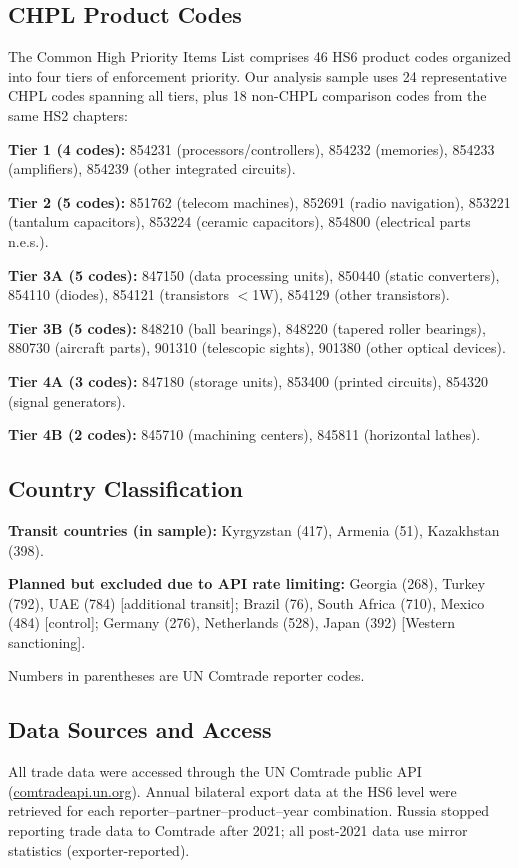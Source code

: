 \documentclass[12pt]{article}
\begin{document}
\subsection{CHPL Product Codes}

The Common High Priority Items List comprises 46 HS6 product codes organized into four tiers of enforcement priority. Our analysis sample uses 24 representative CHPL codes spanning all tiers, plus 18 non-CHPL comparison codes from the same HS2 chapters:

\textbf{Tier 1 (4 codes):} 854231 (processors/controllers), 854232 (memories), 854233 (amplifiers), 854239 (other integrated circuits).

\textbf{Tier 2 (5 codes):} 851762 (telecom machines), 852691 (radio navigation), 853221 (tantalum capacitors), 853224 (ceramic capacitors), 854800 (electrical parts n.e.s.).

\textbf{Tier 3A (5 codes):} 847150 (data processing units), 850440 (static converters), 854110 (diodes), 854121 (transistors $<$1W), 854129 (other transistors).

\textbf{Tier 3B (5 codes):} 848210 (ball bearings), 848220 (tapered roller bearings), 880730 (aircraft parts), 901310 (telescopic sights), 901380 (other optical devices).

\textbf{Tier 4A (3 codes):} 847180 (storage units), 853400 (printed circuits), 854320 (signal generators).

\textbf{Tier 4B (2 codes):} 845710 (machining centers), 845811 (horizontal lathes).

\subsection{Country Classification}

\textbf{Transit countries (in sample):} Kyrgyzstan (417), Armenia (51), Kazakhstan (398).

\textbf{Planned but excluded due to API rate limiting:} Georgia (268), Turkey (792), UAE (784) [additional transit]; Brazil (76), South Africa (710), Mexico (484) [control]; Germany (276), Netherlands (528), Japan (392) [Western sanctioning].

Numbers in parentheses are UN Comtrade reporter codes.

\subsection{Data Sources and Access}

All trade data were accessed through the UN Comtrade public API (\url{comtradeapi.un.org}). Annual bilateral export data at the HS6 level were retrieved for each reporter--partner--product--year combination. Russia stopped reporting trade data to Comtrade after 2021; all post-2021 data use mirror statistics (exporter-reported).
\end{document}
